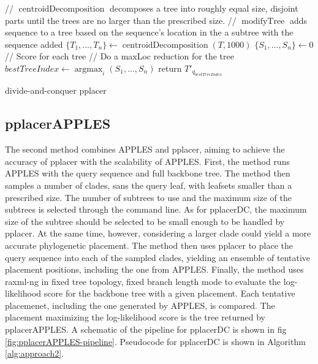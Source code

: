\documentclass[10pt]{article}
\begin{document}
\begin{algorithm}[h]
\SetAlgoLined
{}
 // $\operatorname{centroidDecomposition}$ decomposes a tree into roughly equal size, disjoint parts until the trees are no larger than the prescribed size.\;
 // $\operatorname{modifyTree}$ adds sequence to a tree based on the sequence's location in the a subtree with the sequence added\;
 $\{T_1,\dots,T_n\} \leftarrow \operatorname{centroidDecomposition}(T,1000)$\;
 $\{S_1, \dots, S_n\} \leftarrow 0$ // Score for each tree\;
 // Do a maxLoc reduction for the tree\;
 $bestTreeIndex \leftarrow \operatorname{argmax}_{i} (S_1,\dots,S_n)$\;
 return $T'_{q_{bestTreeIndex}}$\;
 \caption{divide-and-conquer pplacer}
 \label{alg:approach1}
\end{algorithm}

\subsection{pplacerAPPLES}

The second method combines APPLES and pplacer, aiming to achieve the accuracy of pplacer with the scalability of APPLES.
First, the method runs APPLES with the query sequence and full backbone tree.
The method then samples a number of clades, sans the query leaf, with leafsets smaller
than a prescribed size.
The number of subtrees to use and the maximum size of the subtrees is selected through the command line.
As for pplacerDC, the maximum size of the subtree should be selected to be small enough to be handled by pplacer.
At the same time, however, considering a larger clade could yield a more accurate phylogenetic placement.
The method then uses pplacer to place the query sequence into each of the sampled clades, yielding
an ensemble of tentative placement positions, including the one from APPLES.
Finally, the method uses raxml-ng in fixed tree topology, fixed branch length mode to evaluate
the log-likelihood score for the backbone tree with a given placement.
Each tentative placemenet, including the one generated by APPLES, is compared.
The placement maximizing the log-likelihood score is the tree returned by pplacerAPPLES.
A schematic of the pipeline for pplacerDC is shown in fig \ref{fig:pplacerAPPLES-pipeline}.
Pseudocode for pplacerDC is shown in Algorithm \ref{alg:approach2}.
\end{document}
